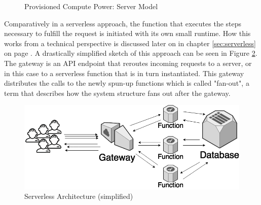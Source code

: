 \begin{figure}[ht]
    \centering
    \caption {Provisioned Compute Power: Server Model}
    \label{graph:provisionedComputePowerServer}
\end{figure}

Comparatively in a serverless approach, the function that executes the steps necessary to fulfill the request is initiated with its own small runtime. How this works from a technical perspective is discussed later on in chapter \ref{sec:serverless} on page \pageref{sec:serverless}. A drastically simplified sketch of this approach can be seen in Figure \ref{fig:serverlessArchHighlevel}. The gateway is an API endpoint that reroutes incoming requests to a server, or in this case to a serverless function that is in turn instantiated. \autocite{Kelly2010UsingInvalidation} This gateway distributes the calls to the newly spun-up functions which is called "fan-out"\autocite{Do2013Limplock}, a term that describes how the system structure fans out after the gateway. 

\begin{figure}[ht]
    \includegraphics[width=\linewidth]{images/drawio/lambda.png}\centering
    \caption {Serverless Architecture (simplified)}
    \label{fig:serverlessArchHighlevel}
\end{figure}

